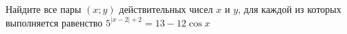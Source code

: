 \begin{ex}
	\begin{condition}
		Найдите все пары \( (x;y) \) действительных чисел \( x \) и \( y \), для каждой из которых выполняется равенство \( 5^{|x-2|+2}=13-12\cos x \)
	\end{condition}
\end{ex}